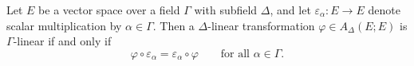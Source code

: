 Let $E$ be a vector space over a field $\Gamma$ with subfield $\Delta$, and let $\varepsilon_{\alpha}: E \to E$ denote scalar multiplication by $\alpha \in \Gamma$. Then a $\Delta$-linear transformation $\varphi \in A_{\Delta}(E; E)$ is $\Gamma$-linear if and only if
$$
\varphi \circ \varepsilon_{\alpha} = \varepsilon_{\alpha} \circ \varphi \qquad \text{for all } \alpha \in \Gamma.
$$
